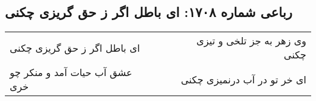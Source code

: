 \begin{center}
\section*{رباعی شماره ۱۷۰۸: ای باطل اگر ز حق گریزی چکنی}
\label{sec:1708}
\begin{longtable}{l p{0.5cm} r}
ای باطل اگر ز حق گریزی چکنی
&&
وی زهر به جز تلخی و تیزی چکنی
\\
عشق آب حیات آمد و منکر چو خری
&&
ای خر تو در آب درنمیزی چکنی
\\
\end{longtable}
\end{center}
